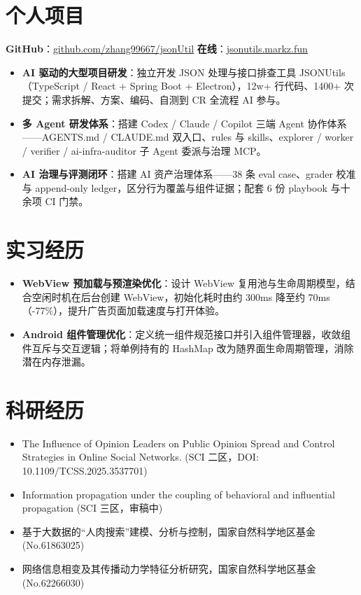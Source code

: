 \documentclass{resume}
\begin{document}
\section{个人项目}
\textbf{GitHub}：\underline{\href{https://github.com/zhang99667/jsonUtil}{github.com/zhang99667/jsonUtil}} \quad \textbf{在线}：\underline{\href{https://jsonutils.markz.fun}{jsonutils.markz.fun}}
  \begin{itemize}
    \item \textbf{AI 驱动的大型项目研发}：独立开发 JSON 处理与接口排查工具 JSONUtils（TypeScript / React + Spring Boot + Electron），12w+ 行代码、1400+ 次提交；需求拆解、方案、编码、自测到 CR 全流程 AI 参与。
    \item \textbf{多 Agent 研发体系}：搭建 Codex / Claude / Copilot 三端 Agent 协作体系——AGENTS.md / CLAUDE.md 双入口、rules 与 skills、explorer / worker / verifier / ai-infra-auditor 子 Agent 委派与治理 MCP。
    \item \textbf{AI 治理与评测闭环}：搭建 AI 资产治理体系——38 条 eval case、grader 校准与 append-only ledger，区分行为覆盖与组件证据；配套 6 份 playbook 与十余项 CI 门禁。
  \end{itemize}


\section{实习经历}
\begin{onehalfspacing}
  \begin{itemize}
    \item \textbf{WebView 预加载与预渲染优化}：设计 WebView 复用池与生命周期模型，结合空闲时机在后台创建 WebView，初始化耗时由约 300ms 降至约 70ms（-77\%），提升广告页面加载速度与打开体验。
    \item \textbf{Android 组件管理优化}：定义统一组件规范接口并引入组件管理器，收敛组件互斥与交互逻辑；将单例持有的 HashMap 改为随界面生命周期管理，消除潜在内存泄漏。
  \end{itemize}
\end{onehalfspacing}

\section{科研经历}
\begin{itemize}[parsep=0.2ex]
  \item The Influence of Opinion Leaders on Public Opinion Spread and Control Strategies in Online Social Networks. (SCI 二区，DOI: 10.1109/TCSS.2025.3537701)
  \item Information propagation under the coupling of behavioral and influential propagation (SCI 三区，审稿中)
  \item 基于大数据的“人肉搜索”建模、分析与控制，国家自然科学地区基金(No.61863025)
  \item 网络信息相变及其传播动力学特征分析研究，国家自然科学地区基金(No.62266030)
\end{itemize}
\end{document}
